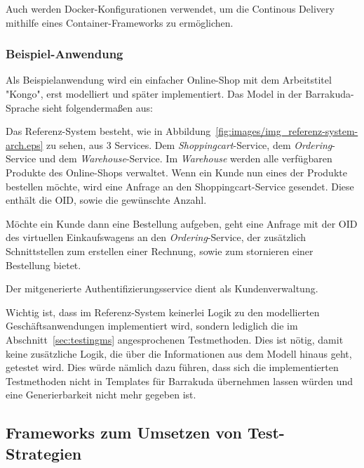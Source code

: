 \documentclass[12pt,a4paper,bibliography=totocnumbered,listof=totocnumbered]{scrartcl}
\begin{document}
Auch werden Docker-Konfigurationen verwendet, um die Continous Delivery mithilfe eines Container-Frameworks zu ermöglichen.

\subsubsection{Beispiel-Anwendung}

Als Beispielanwendung wird ein einfacher Online-Shop mit dem Arbeitstitel "Kongo", erst modelliert und später implementiert. Das Model in der Barrakuda-Sprache sieht folgendermaßen aus:



Das Referenz-System besteht, wie in Abbildung~\ref{fig:images/img_referenz-system-arch.eps} zu sehen, aus 3 Services. Dem \textit{Shoppingcart}-Service, dem \textit{Ordering}-Service und dem \textit{Warehouse}-Service. Im \textit{Warehouse} werden alle verfügbaren Produkte des Online-Shops verwaltet. Wenn ein Kunde nun eines der Produkte bestellen möchte, wird eine Anfrage an den Shoppingcart-Service gesendet. Diese enthält die OID, sowie die gewünschte Anzahl.

Möchte ein Kunde dann eine Bestellung aufgeben, geht eine Anfrage mit der OID des virtuellen Einkaufswagens an den \textit{Ordering}-Service, der zusätzlich Schnittstellen zum erstellen einer Rechnung, sowie zum stornieren einer Bestellung bietet.

Der mitgenerierte Authentifizierungsservice dient als Kundenverwaltung.


Wichtig ist, dass im Referenz-System keinerlei Logik zu den modellierten Geschäftsanwendungen implementiert wird, sondern lediglich die im Abschnitt~\ref{sec:testingms} angesprochenen Testmethoden. Dies ist nötig, damit keine zusätzliche Logik, die über die Informationen aus dem Modell hinaus geht, getestet wird. Dies würde nämlich dazu führen, dass sich die implementierten Testmethoden nicht in Templates für Barrakuda übernehmen lassen würden und eine Generierbarkeit nicht mehr gegeben ist.

\subsection{Frameworks zum Umsetzen von Test-Strategien}\label{ch:ms-test-frw}
\end{document}
